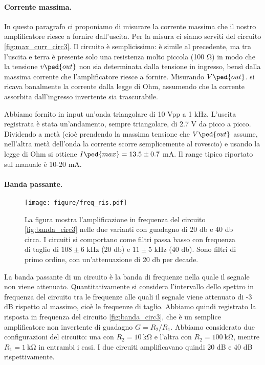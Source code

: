 \paragraph{Corrente massima.}

In questo paragrafo ci proponiamo di misurare la corrente massima che il nostro amplificatore
riesce a fornire dall'uscita. Per la misura ci siamo serviti del circuito \ref{fig:max_curr_circ3}.
Il circuito è semplicissimo: è simile al precedente, ma tra l'uscita e terra è presente solo una resistenza
molto piccola (100 \si{\ohm}) in modo che la tensione $v\ped{out}$ non sia determinata dalla tensione
in ingresso, bensì dalla massima corrente che l'amplificatore riesce a fornire. Misurando $V\ped{out}$.
si ricava banalmente la corrente dalla legge di Ohm, assumendo che la corrente assorbita dall'ingresso
invertente sia trascurabile.

Abbiamo fornito in input un'onda triangolare di 10 Vpp a 1 kHz. L'uscita registrata è stata un'andamento,
sempre triangolare, di 2.7 V da picco a picco. Dividendo a metà (cioè prendendo la massima tensione che $V\ped{out}$
assume, nell'altra metà dell'onda la corrente scorre semplicemente al rovescio) e usando la legge di Ohm
si ottiene $I\ped{max} = 13.5 \pm 0.7$ mA. Il range tipico riportato sul manuale è 10-20 mA.

\paragraph{Banda passante.}

\begin{figure*}[t]
    \texttt{[image: figure/freq\_ris.pdf]}
    \caption{La figura mostra l'amplificazione in frequenza del circuito \ref{fig:banda_circ3}
        nelle due varianti con guadagno di 20 db e 40 db circa. I circuiti si comportano come filtri
        passa basso con frequenza di taglio di $108 \pm 6$ kHz (20 db) e $11 \pm 5$ kHz (40 db).
        Sono filtri di primo ordine, con un'attenuazione di 20 db per decade.}
    \label{fig:freq_ris3}
\end{figure*}

La banda passante di un circuito è la banda di frequenze nella quale il segnale non viene attenuato.
Quantitativamente si considera l'intervallo dello spettro in frequenza del circuito tra le
frequenze alle quali il segnale viene attenuato di -3 dB rispetto al massimo, cioè le frequenze di taglio. Abbiamo quindi
registrato la risposta in frequenza del circuito \ref{fig:banda_circ3}, che è un semplice amplificatore
non invertente di guadagno $G = R_2/R_1$. Abbiamo considerato due configurazioni del circuito:
una con $R_2 = \SI{10}{\kilo\ohm}$ e l'altra con $R_2 = \SI{100}{\kilo\ohm}$, mentre $R_1 = \SI{1}{\kilo\ohm}$
in entrambi i casi. I due circuiti amplificavano quindi 20 dB e 40 dB rispettivamente.

